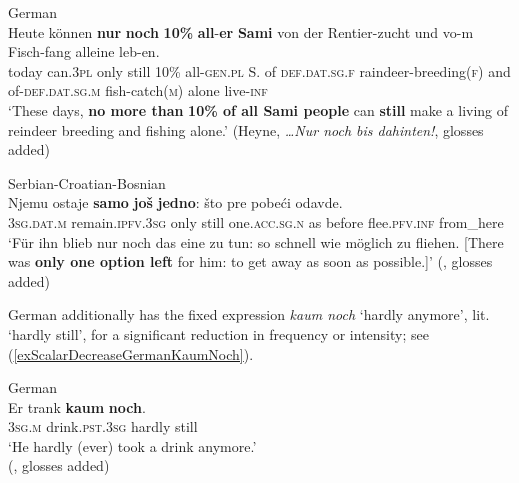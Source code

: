 \begin{exe}	
	\ex German\label{exScalarDecreaseGermanNurNoch}\\
	\gll Heute können \textbf{nur} \textbf{noch} \textbf{10\%} \textbf{all}-\textbf{er} \textbf{Sami} von der Rentier-zucht und vo-m Fisch-fang alleine leb-en.\\
	today can.3\textsc{pl} only still 10\% all-\textsc{gen}.\textsc{pl} S. of \textsc{def}.\textsc{dat}.\textsc{sg}.\textsc{f} raindeer-breeding(\textsc{f}) and of-\textsc{def}.\textsc{dat}.\textsc{sg}.\textsc{m} fish-catch(\textsc{m}) alone live-\textsc{inf}\\
	\glt \lq These days, \textbf{no more than} \textbf{10\% of all Sami people} can \textbf{still} make a living of reindeer breeding and fishing alone.\rq{ }(Heyne, \textit{…Nur noch bis dahinten!}, glosses added)

	\ex Serbian-Croatian-Bosnian\label{exScalarDecreaseSerbianJoSSamo}\\
	\gll Njemu ostaje \textbf{samo} \textbf{još} \textbf{jedno}: što pre pobeći odavde.\\
	 3\textsc{sg}.\textsc{dat}.\textsc{m} remain.\textsc{ipfv}.3\textsc{sg} only still one.\textsc{acc}.\textsc{sg}.\textsc{n}  as before flee.\textsc{pfv}.\textsc{inf} from\_here\\
	 \glt \lq Für ihn blieb nur noch das eine zu tun: so schnell wie möglich zu fliehen. [There was \textbf{only one option left} for him: to get away as soon as possible.]' (\cite[248]{KontrastiveGrammatik}, glosses added)
\end{exe}

German additionally has the fixed expression \textit{kaum noch} \lq hardly anymore\rq{}, lit. \lq{}hardly still\rq{}, for a significant reduction in frequency or intensity; see (\ref{exScalarDecreaseGermanKaumNoch}).

\begin{exe}
	\ex German\label{exScalarDecreaseGermanKaumNoch}\\
	\gll Er trank \textbf{kaum} \textbf{noch}.\\
	3\textsc{sg}.\textsc{m} drink.\textsc{pst}.3\textsc{sg} hardly still\\
	\glt \lq He hardly (ever) took a drink anymore.\rq{}
	\\(\cite[172]{KoenigEtAl1993}, glosses added)
\end{exe}

